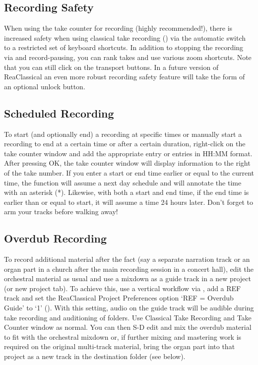 \documentclass[10pt,american]{article}
\begin{document}
\subsection{Recording Safety}

When using the take counter for recording (highly recommended!), there is
increased safety when using classical take recording () via the
automatic switch to a restricted set of keyboard shortcuts. In addition to
stopping the recording via  and record-pausing, you can rank takes and
use various zoom shortcuts. Note that you can still click on the transport
buttons. In a future version of ReaClassical an even more robust recording
safety feature will take the form of an optional unlock button.

\subsection{Scheduled Recording}

To start (and optionally end) a recording at specific times or manually start a
recording to end at a certain time or after a certain duration, right-click on
the take counter window and add the appropriate entry or entries in HH:MM
format. After pressing OK, the take counter window will display information to
the right of the take number. If you enter a start or end time earlier or equal
to the current time, the function will assume a next day schedule and will
annotate the time with an asterisk ({*}). Likewise, with both a start and end
time, if the end time is earlier than or equal to start, it will assume a time
24 hours later. Don't forget to arm your tracks before walking away!

\subsection{Overdub Recording}

To record additional material after the fact (say a separate narration track or
an organ part in a church after the main recording session in a concert hall),
edit the orchestral material as usual and use a mixdown as a guide track in a
new project (or new project tab). To achieve this, use a vertical workflow via
, add a REF track  and set the ReaClassical Project Preferences
option `REF = Overdub Guide' to `1' (). With this setting, audio on the
guide track will be audible during take recording and auditioning of folders.
Use Classical Take Recording  and Take Counter window
\keys{\ctrl+\enter} as normal. You can then S-D edit and mix the overdub
material to fit with the orchestral mixdown or, if further mixing and mastering
work is required on the original multi-track material, bring the organ part into
that project as a new track in the destination folder  (see
below).
\end{document}
